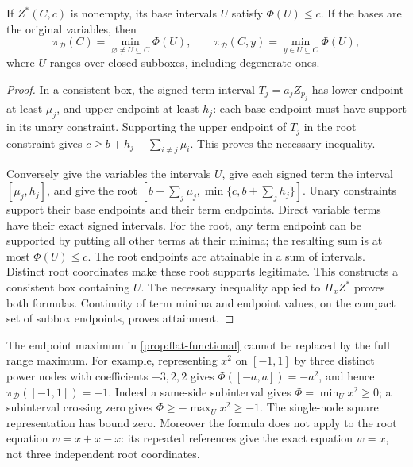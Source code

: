 \begin{theorem}
\label{prop:flat-formula}
If $Z^*(C,c)$ is nonempty, its base intervals $U$ satisfy $\Phi(U)\le c$.
If the bases are the original variables, then
\begin{equation}
 \pi_{\mathcal D}(C)=\min_{\varnothing\ne U\subseteq C}\Phi(U),\qquad
 \pi_{\mathcal D}(C,y)=\min_{y\in U\subseteq C}\Phi(U),
 \label{prop:flat-minima}
\end{equation}
where $U$ ranges over closed subboxes, including degenerate ones.
\end{theorem}

\begin{proof}
In a consistent box, the signed term interval $T_j=a_jZ_{p_j}$ has lower
endpoint at least $\mu_j$, and upper endpoint at least $h_j$: each base
endpoint must have support in its unary constraint. Supporting the upper
endpoint of $T_j$ in the root constraint gives
$c\ge b+h_j+\sum_{i\ne j}\mu_i$. This proves the necessary inequality.

Conversely give the variables the intervals $U$, give each signed term
the interval $[\mu_j,h_j]$, and give the root
$[b+\sum_j\mu_j,\min\{c,b+\sum_jh_j\}]$. Unary constraints support their
base endpoints and their term endpoints. Direct variable terms have
their exact signed intervals. For the root, any term endpoint can be
supported by putting all other terms at their minima; the resulting sum
is at most $\Phi(U)\le c$. The root endpoints are attainable in a sum
of intervals. Distinct root coordinates make these root supports legitimate.
This constructs a consistent box containing $U$. The necessary inequality
applied to $\Pi_x Z^*$ proves both formulas. Continuity of term minima and
endpoint values, on the compact set of subbox endpoints, proves attainment.
\end{proof}

The endpoint maximum in \eqref{prop:flat-functional} cannot be replaced by
the full range maximum. For example, representing $x^2$ on $[-1,1]$ by
three distinct power nodes with coefficients $-3,2,2$ gives
$\Phi([-a,a])=-a^2$, and hence $\pi_{\mathcal D}([-1,1])=-1$.
Indeed a same-side subinterval gives $\Phi=\min_Ux^2\ge0$; a subinterval
crossing zero gives $\Phi\ge-\max_Ux^2\ge-1$.
The single-node square representation has bound zero. Moreover the formula
does not apply to the root equation $w=x+x-x$: its repeated references
give the exact equation $w=x$, not three independent root coordinates.

